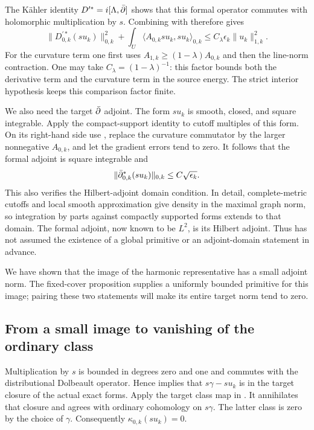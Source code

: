 The K\"ahler identity
$D^{\prime *}=i[\Lambda,\bar\partial]$ shows that this formal operator
commutes with holomorphic multiplication by $s$.  Combining
with  therefore gives
\begin{equation}\label{eq:target-bochner-energy}
 \|D_{0,k}^{\prime *}(su_k)\|_{0,k}^2
 +\int_U\langle A_{0,k}su_k,su_k\rangle_{0,k}
 \le C_\lambda\epsilon_k\|u_k\|_{1,k}^2.
\end{equation}
For the curvature term one first uses
$A_{1,k}\ge(1-\lambda)A_{0,k}$ and then the line-norm contraction.
One may take $C_\lambda=(1-\lambda)^{-1}$: this factor bounds both
the derivative term and the curvature term in the source energy.
The strict interior hypothesis keeps this comparison factor finite.

We also need the target $\bar\partial$ adjoint.  The form $su_k$ is smooth,
closed, and square integrable.  Apply the compact-support identity to
cutoff multiples of this form.  On its right-hand side use
, replace the curvature commutator by
the larger nonnegative $A_{0,k}$, and let the gradient errors tend to
zero.  It follows that the formal adjoint is square integrable and
\begin{equation}\label{eq:small-target-adjoint}
 \|\bar\partial^*_{0,k}(su_k)\|_{0,k}
       \le C\sqrt{\epsilon_k}.
\end{equation}
This also verifies the Hilbert-adjoint domain condition.  In detail,
complete-metric cutoffs and local smooth approximation give density in
the maximal graph norm, so integration by parts against compactly
supported forms extends to that domain.  The formal adjoint, now
known to be $L^2$, is its Hilbert adjoint.  Thus
 has not assumed the existence of a
global primitive or an adjoint-domain statement in advance.

We have shown that the image of the harmonic representative has a
small adjoint norm.  The fixed-cover proposition supplies a uniformly
bounded primitive for this image; pairing these two statements will
make its entire target norm tend to zero.

\subsection{From a small image to vanishing of the ordinary class}

Multiplication by $s$ is bounded in degrees zero and one and commutes
with the distributional Dolbeault operator.  Hence
 implies that
$s\gamma-su_k$ is in the target closure of the actual exact forms.
Apply the target class map in .  It
annihilates that closure and agrees with ordinary cohomology on
$s\gamma$.  The latter class is zero by the choice of $\gamma$.
Consequently $\kappa_{0,k}(su_k)=0$.

